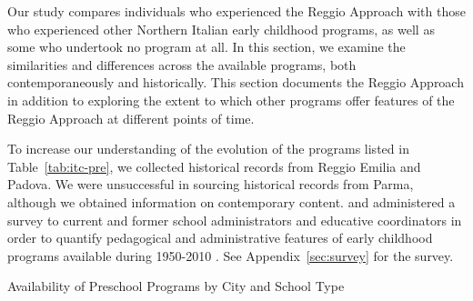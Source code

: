 Our study compares individuals who experienced the Reggio Approach with those who experienced other Northern Italian early childhood programs, as well as some who undertook no program at all. In this section, we examine the similarities and differences across the available programs, both contemporaneously and historically. This section documents the Reggio Approach in addition to exploring the extent to which other programs offer features of the Reggio Approach at different points of time.

To increase our understanding of the evolution of the programs listed in Table~\ref{tab:itc-pre}, we collected historical records from Reggio Emilia and Padova. We were unsuccessful in sourcing historical records from Parma, although we obtained information on contemporary content. \citep{Padova-Admin-Data_1964-2011,Reggio-Admin-data_1966-2006,Reggio-Annual-Journals_1994-2011} and administered a survey to current and former school administrators and educative coordinators in order to quantify pedagogical and administrative features of early childhood programs available during 1950-2010 \citep{CEHD_2016_Historical-Analysis}. See Appendix~\ref{sec:survey} for the survey.
~\\
\begin{table}[H]
\centering
\caption{Availability of Preschool Programs by City and School Type}\label{tab:itc-pre}
\begin{adjustbox}{width=\textwidth}
\begin{threeparttable}
	
\begin{tablenotes}
\end{tablenotes}
\end{threeparttable}
\end{adjustbox}
\end{table}

